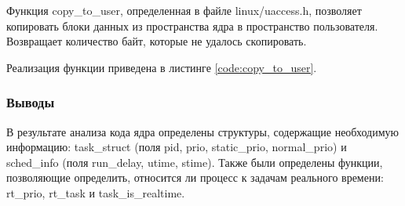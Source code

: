 Функция copy\_to\_user, определенная в файле linux/uaccess.h, позволяет копировать блоки данных из пространства ядра в пространство пользователя. Возвращает количество байт, которые не удалось скопировать. \cite{universityOfBirningham}

Реализация функции приведена в листинге \ref{code:copy_to_user}.


\subsubsection*{Выводы}
В результате анализа кода ядра определены структуры, содержащие необходимую информацию: task\_struct (поля pid, prio, static\_prio, normal\_prio) и sched\_info (поля run\_delay, utime, stime). Также были определены функции, позволяющие определить, относится ли процесс к задачам реального времени: rt\_prio, rt\_task и task\_is\_realtime.

\pagebreak